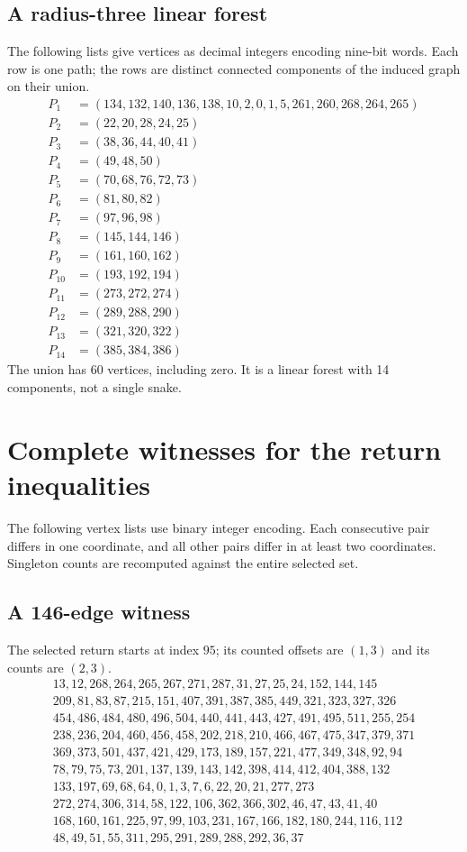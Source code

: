 \documentclass[11pt,a4paper]{article}
\theoremstyle{definition}
\theoremstyle{remark}
\begin{document}
\subsection{A radius-three linear forest}\label{app:radius-three}
The following lists give vertices as decimal integers encoding nine-bit words. Each row is one path; the rows are distinct connected components of the induced graph on their union.
\begin{align*}
P_{1}&=(134,132,140,136,138,10,2,0,1,5,261,260,268,264,265)\\
P_{2}&=(22,20,28,24,25)\\
P_{3}&=(38,36,44,40,41)\\
P_{4}&=(49,48,50)\\
P_{5}&=(70,68,76,72,73)\\
P_{6}&=(81,80,82)\\
P_{7}&=(97,96,98)\\
P_{8}&=(145,144,146)\\
P_{9}&=(161,160,162)\\
P_{10}&=(193,192,194)\\
P_{11}&=(273,272,274)\\
P_{12}&=(289,288,290)\\
P_{13}&=(321,320,322)\\
P_{14}&=(385,384,386)
\end{align*}
The union has 60 vertices, including zero. It is a linear forest with 14 components, not a single snake.


\section{Complete witnesses for the return inequalities}\label{app:return-witnesses}
The following vertex lists use binary integer encoding. Each consecutive pair differs in one coordinate, and all other pairs differ in at least two coordinates. Singleton counts are recomputed against the entire selected set.
\subsection{A 146-edge witness}
The selected return starts at index $95$; its counted offsets are $(1,3)$ and its counts are $(2,3)$.
\[
\begin{gathered}
13,12,268,264,265,267,271,287,31,27,25,24,152,144,145\\
209,81,83,87,215,151,407,391,387,385,449,321,323,327,326\\
454,486,484,480,496,504,440,441,443,427,491,495,511,255,254\\
238,236,204,460,456,458,202,218,210,466,467,475,347,379,371\\
369,373,501,437,421,429,173,189,157,221,477,349,348,92,94\\
78,79,75,73,201,137,139,143,142,398,414,412,404,388,132\\
133,197,69,68,64,0,1,3,7,6,22,20,21,277,273\\
272,274,306,314,58,122,106,362,366,302,46,47,43,41,40\\
168,160,161,225,97,99,103,231,167,166,182,180,244,116,112\\
48,49,51,55,311,295,291,289,288,292,36,37
\end{gathered}
\]
\end{document}
